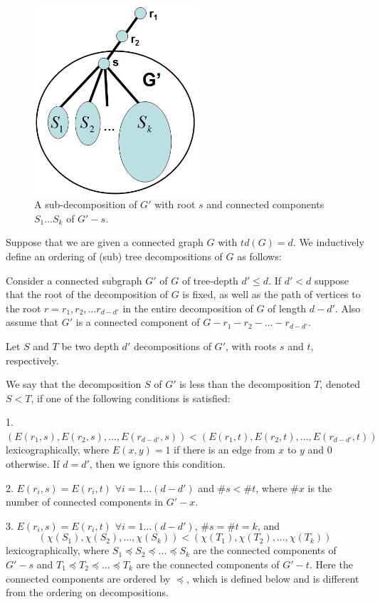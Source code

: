 \documentclass[11pt]{report}
\begin{document}
\begin{figure}[t]
\begin{center}
\leavevmode
\includegraphics[height=70mm]{td_partial_decomp_v1.png}
\end{center}
\caption{A sub-decomposition of $G'$ with root $s$ and connected components $S_1...S_k$ of $G'-s$.}
\label{fig:td_sub_decomp}
\end{figure}



Suppose that we are given a connected graph $G$ with $td(G)=d$. We inductively define an ordering of (sub) tree decompositions of $G$ as follows:


Consider a connected subgraph $G'$ of $G$ of tree-depth $d'\leq d$. If $d'<d $ suppose that the root of the decomposition of $G$ is fixed, as well as the path of vertices to the root $r=r_1, r_2, ... r_{d-d'}$ in the entire decomposition of $G$ of length $d-d'$. Also assume that $G'$ is a connected component of $G-r_1-r_2-...-r_{d-d'}$.

Let $S$ and $T$ be two depth $d'$ decompositions of $G'$, with roots $s$ and $t$, respectively.


\newpage


We say that the decomposition $S$ of $G'$ is less than the decomposition $T$, denoted $S<T$, if one of the following conditions is satisfied:

1. $(E(r_1,s), E(r_2,s),...,E(r_{d-d'},s))<(E(r_1,t), E(r_2,t),...,E(r_{d-d'},t))$ lexicographically, where $E(x,y)=1$ if there is an edge from $x$ to $y$ and 0 otherwise. If $d=d'$, then we ignore this condition.

2. $E(r_i, s)=E(r_i,t)$ $\forall i=1...(d-d')$ and $\#s < \#t$, where $\#x$ is the number of connected components in $G'-x$.

3. $E(r_i, s)=E(r_i,t)$ $\forall i=1...(d-d')$, $\#s = \#t= k$, and \[(\chi(S_1), \chi(S_2), ...,\chi (S_k)) < (\chi(T_1), \chi(T_2),...,\chi(T_k))\] lexicographically, where $S_1 \preceq S_2 \preceq ... \preceq S_k$ are the connected components of $G'-s$ and $T_1\preceq T_2\preceq ... \preceq T_k$ are the connected components of $G'-t$. Here the connected components are ordered by $\preceq$, which is defined below and is different from the ordering on decompositions.
\end{document}
